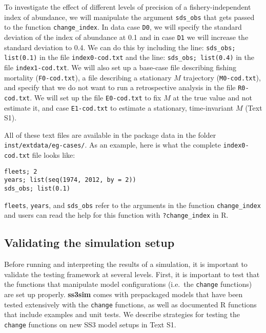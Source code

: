 To investigate the effect of different levels of precision of a
fishery-independent index of abundance, we will manipulate the argument
\texttt{sds\_obs} that gets passed to the function \texttt{change\_index}. In
data case \texttt{D0}, we will specify the standard deviation of the index of
abundance at 0.1 and in case \texttt{D1} we will increase the standard
deviation to 0.4. We can do this by including the line: \texttt{sds\_obs;
  list(0.1)} in the file \texttt{index0-cod.txt} and the line:
\texttt{sds\_obs; list(0.4)} in the file \texttt{index1-cod.txt}. We will also
set up a base-case file describing fishing mortality (\texttt{F0-cod.txt}), a
file describing a stationary $M$ trajectory (\texttt{M0-cod.txt}), and specify
that we do not want to run a retrospective analysis in the file
\texttt{R0-cod.txt}. We will set up the file \texttt{E0-cod.txt} to fix $M$ at
the true value and not estimate it, and case \texttt{E1-cod.txt} to estimate a
stationary, time-invariant $M$ (Text S1).

All of these text files are available in the package data in the folder
\texttt{inst/extdata/eg-cases/}. As an example, here is what the complete
\texttt{index0-cod.txt} file looks like:

\begin{verbatim}
fleets; 2
years; list(seq(1974, 2012, by = 2))
sds_obs; list(0.1)
\end{verbatim}

\noindent
\texttt{fleets}, \texttt{years}, and \texttt{sds\_obs} refer to the arguments
in the function \texttt{change\_index} and users can read the help for this
function with \texttt{?change\_index} in \textsf{R}.

\subsection*{Validating the simulation setup}

Before running and interpreting the results of a simulation, it is
important to validate the testing framework at several levels. First, it is
important to test that the functions that manipulate model configurations
(i.e.~the \texttt{change} functions) are set up properly. \textbf{ss3sim} comes
with prepackaged models that have been tested extensively with the
\texttt{change} functions, as well as documented \textsf{R} functions that
include examples and unit tests. We describe strategies for testing the
\texttt{change} functions on new SS3 model setups in Text S1.

